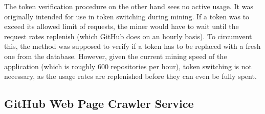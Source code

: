 The token verification procedure on the other hand sees no active usage.
It was originally intended for use in token switching during mining.
If a token was to exceed its allowed limit of requests, the miner would have to wait until the request rates replenish (which GitHub does on an hourly basis).
To circumvent this, the method was supposed to verify if a token has to be replaced with a fresh one from the database.
However, given the current mining speed of the application (which is roughly 600 repositories per hour), token switching is not necessary, as the usage rates are replenished before they can even be fully spent.

\subsection{GitHub Web Page Crawler Service}

